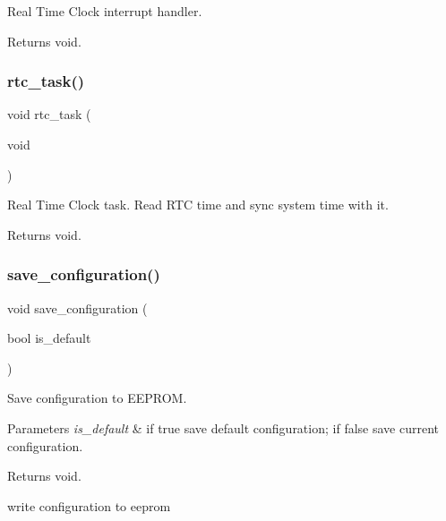 Real Time Clock interrupt handler. 

\begin{DoxyReturn}{Returns}
void. 
\end{DoxyReturn}
\mbox{\label{rmap_8ino_a52f7fb7ebbd710f2a06b3f6e47c7e7e3}} 
\subsubsection{\texorpdfstring{rtc\+\_\+task()}{rtc\_task()}}
{\footnotesize\ttfamily void rtc\+\_\+task (\begin{DoxyParamCaption}\item[{void}]{ }\end{DoxyParamCaption})}



Real Time Clock task. Read R\+TC time and sync system time with it. 

\begin{DoxyReturn}{Returns}
void. 
\end{DoxyReturn}
\mbox{\label{rmap_8ino_afa979a8cb238fe81bf20654dfd6096ef}} 
\subsubsection{\texorpdfstring{save\+\_\+configuration()}{save\_configuration()}}
{\footnotesize\ttfamily void save\+\_\+configuration (\begin{DoxyParamCaption}\item[{bool}]{is\+\_\+default }\end{DoxyParamCaption})}



Save configuration to E\+E\+P\+R\+OM. 


\begin{DoxyParams}{Parameters}
{\em is\+\_\+default} & if true save default configuration; if false save current configuration. \\
\hline
\end{DoxyParams}
\begin{DoxyReturn}{Returns}
void. 
\end{DoxyReturn}
write configuration to eeprom

